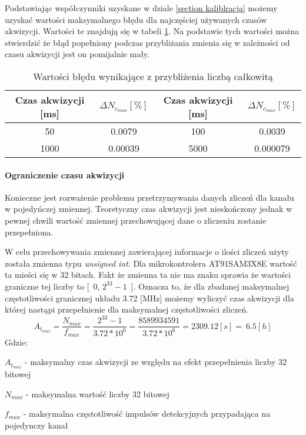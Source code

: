 Podstawiając współczynniki uzyskane w dziale \ref{section kaliblracja} możemy uzyskać wartości maksymalnego błędu dla najczęściej używanych czasów akwizycji. Wartości te znajdują się w tabeli \ref{tab przyblizenie niep}. Na podstawie tych wartości można stwierdzić że błąd popełniony podczas przybliżania zmienia się w zależności od czasu akwizycji jest on pomijalnie mały.

\begin{table}
        \centering
        \caption{Wartości błędu wynikające z przybliżenia liczbą całkowitą}
        \label{tab przyblizenie niep}
        \begin{tabular}{|c|c||c|c|}
                \hline
                Czas akwizycji [ms] &   $\Delta N_{c_{max}} [\%]$&Czas akwizycji [ms] &   $\Delta N_{c_{max}} [\%]$ \\ \hline
                50 & 0.0079 & 100 & 0.0039 \\ \hline
                1000 & 0.00039 & 5000 & 0.000079 \\ \hline
        \end{tabular}
\end{table}

\paragraph{Ograniczenie czasu akwizycji}

Konieczne jest rozważenie problemu przetrzymywania danych zliczeń dla kanału w pojedyńczej zmiennej. Teoretyczny czas akwizycji jest nieskończony jednak w pewnej chwili wartość zmiennej przechowującej dane o zliczeniu zostanie przepełniona.

W celu przechowywania zmiennej zawierającej informacje o ilości zliczeń użyty została zmienna typu \textit{unsigned int}. Dla mikrokontrolera AT91SAM3X8E wartość ta mieści się w 32 bitach. Fakt że zmienna ta nie ma znaku sprawia że wartości graniczne tej liczby to [~0, $2^{33}-1$~]. Oznacza to, że dla zbadanej maksymalnej częstotliwości granicznej układu 3.72 [MHz] możemy wyliczyć czas akwizycji dla której nastąpi przepełnienie dla maksymalnej częstotliwości zliczeń. 
\begin{equation}
        A_{t_{max}} = \frac{N_{max}}{f_{max}} = \frac{2^{33}-1}{3.72 * 10^{6}} = \frac{8589934591}{3.72 * 10^{6}} = 2309.12 [s] = ~6.5 [h]
\end{equation}
Gdzie:
\begin{description}
        \item $A_{t_{max}}$ - maksymalny czas akwizycji ze względu na efekt przepełnienia liczby 32 bitowej
        \item $N_{max}$ - maksymalna wartość liczby 32 bitowej
        \item $f_{max}$ - maksymalna częstotliwość impulsów detekcyjnych przypadająca na pojedynczy kanał
\end{description}

